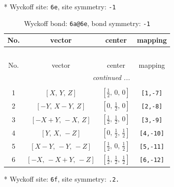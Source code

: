\documentclass[fleqn,8pt]{jsarticle}
\begin{document}
* Wyckoff site: {\tt 6e}, site symmetry: {\tt -1}
\renewcommand{\arraystretch}{1.2}
\begin{longtable}{cccc}
\caption{Wyckoff bond: {\tt 6a@6e}, bond symmetry: {\tt -1}}
 \\
 \hline \hline
No. & vector & center & mapping \\ \hline \endfirsthead

\multicolumn{3}{l}{\tablename\ \thetable{}} \\
 \hline \hline
No. & vector & center & mapping \\ \hline \endhead

 \hline \hline
\multicolumn{3}{r}{\footnotesize\it continued ...} \\ \endfoot

 \hline \hline
\multicolumn{3}{r}{} \\ \endlastfoot

1 & $\left[ X,\, Y,\, Z \right]$ & $\left[ \frac{1}{2},\, 0,\, 0 \right]$ & {\tt [1,-7]} \\ \hline
2 & $\left[ - Y,\, X - Y,\, Z \right]$ & $\left[ 0,\, \frac{1}{2},\, 0 \right]$ & {\tt [2,-8]} \\ \hline
3 & $\left[ - X + Y,\, - X,\, Z \right]$ & $\left[ \frac{1}{2},\, \frac{1}{2},\, 0 \right]$ & {\tt [3,-9]} \\ \hline
4 & $\left[ Y,\, X,\, - Z \right]$ & $\left[ 0,\, \frac{1}{2},\, \frac{1}{2} \right]$ & {\tt [4,-10]} \\ \hline
5 & $\left[ X - Y,\, - Y,\, - Z \right]$ & $\left[ \frac{1}{2},\, 0,\, \frac{1}{2} \right]$ & {\tt [5,-11]} \\ \hline
6 & $\left[ - X,\, - X + Y,\, - Z \right]$ & $\left[ \frac{1}{2},\, \frac{1}{2},\, \frac{1}{2} \right]$ & {\tt [6,-12]} \\
\end{longtable}
* Wyckoff site: {\tt 6f}, site symmetry: {\tt .2.}
\renewcommand{\arraystretch}{1.2}
\end{document}
